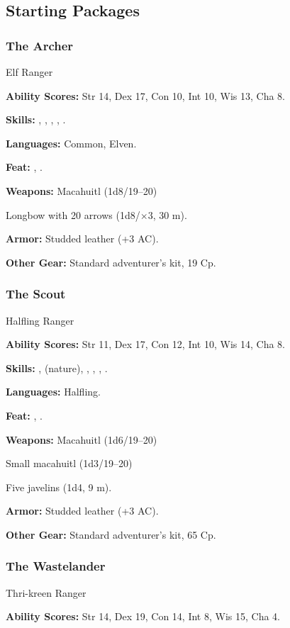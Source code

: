 \subsection{Starting Packages}
\subsubsection{The Archer}
Elf Ranger

\textbf{Ability Scores:} Str 14, Dex 17, Con 10, Int 10, Wis 13, Cha 8.

\textbf{Skills:} , , , , .

\textbf{Languages:} Common, Elven.

\textbf{Feat:} , .

\textbf{Weapons:} Macahuitl (1d8/19--20)

Longbow with 20 arrows (1d8/$\times$3, 30 m).

\textbf{Armor:} Studded leather (+3 AC).

\textbf{Other Gear:} Standard adventurer's kit, 19 Cp.

\subsubsection{The Scout}
Halfling Ranger

\textbf{Ability Scores:} Str 11, Dex 17, Con 12, Int 10, Wis 14, Cha 8.

\textbf{Skills:} ,  (nature), , , , .

\textbf{Languages:} Halfling.

\textbf{Feat:} , .

\textbf{Weapons:} Macahuitl (1d6/19--20)

Small macahuitl (1d3/19--20)

Five javelins (1d4, 9 m).

\textbf{Armor:} Studded leather (+3 AC).

\textbf{Other Gear:} Standard adventurer's kit, 65 Cp.

\subsubsection{The Wastelander}
Thri-kreen Ranger

\textbf{Ability Scores:} Str 14, Dex 19, Con 14, Int 8, Wis 15, Cha 4.

